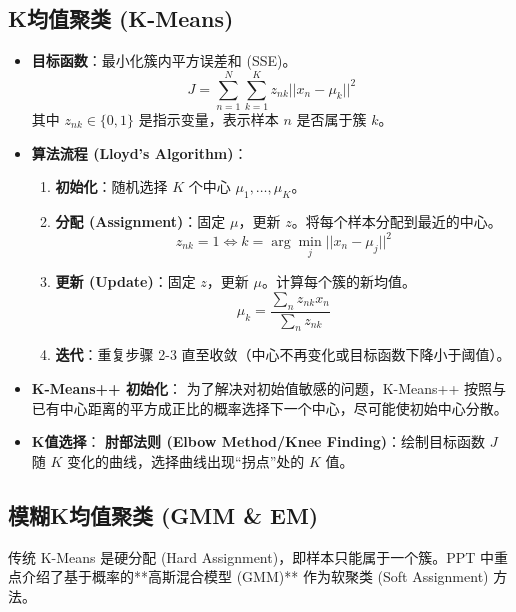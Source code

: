 \documentclass[a4paper, 11pt]{ctexart}
\begin{document}
\subsection{K均值聚类 (K-Means)}
\begin{itemize}
    \item \textbf{目标函数}：最小化簇内平方误差和 (SSE)。
    \begin{equation}
        J = \sum_{n=1}^N \sum_{k=1}^K z_{nk} ||x_n - \mu_k||^2
    \end{equation}
    其中 $z_{nk} \in \{0, 1\}$ 是指示变量，表示样本 $n$ 是否属于簇 $k$。
    \item \textbf{算法流程 (Lloyd's Algorithm)}：
    \begin{enumerate}
        \item \textbf{初始化}：随机选择 $K$ 个中心 $\mu_1, \dots, \mu_K$。
        \item \textbf{分配 (Assignment)}：固定 $\mu$，更新 $z$。将每个样本分配到最近的中心。
        \[ z_{nk} = 1 \iff k = \arg \min_j ||x_n - \mu_j||^2 \]
        \item \textbf{更新 (Update)}：固定 $z$，更新 $\mu$。计算每个簇的新均值。
        \[ \mu_k = \frac{\sum_{n} z_{nk} x_n}{\sum_{n} z_{nk}} \]
        \item \textbf{迭代}：重复步骤 2-3 直至收敛（中心不再变化或目标函数下降小于阈值）。
    \end{enumerate}
    \item \textbf{K-Means++ 初始化}：
    为了解决对初始值敏感的问题，K-Means++ 按照与已有中心距离的平方成正比的概率选择下一个中心，尽可能使初始中心分散。
    \item \textbf{K值选择}：
    \textbf{肘部法则 (Elbow Method/Knee Finding)}：绘制目标函数 $J$ 随 $K$ 变化的曲线，选择曲线出现“拐点”处的 $K$ 值。
\end{itemize}

\subsection{模糊K均值聚类 (GMM \& EM)}
传统 K-Means 是硬分配 (Hard Assignment)，即样本只能属于一个簇。PPT 中重点介绍了基于概率的**高斯混合模型 (GMM)** 作为软聚类 (Soft Assignment) 方法。
\end{document}
